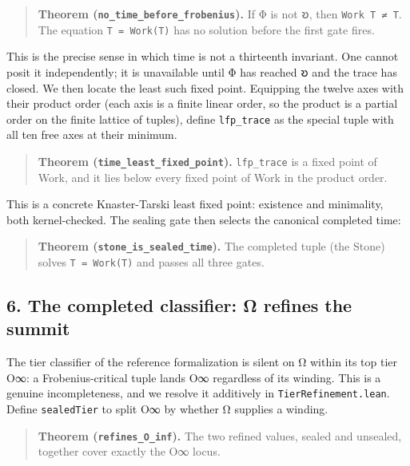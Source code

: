 \begin{quote}
\textbf{Theorem (\texttt{no\_time\_before\_frobenius}).} If Φ is not 𐑹,
then \texttt{Work\ T\ ≠\ T}. The equation \texttt{T\ =\ Work(T)} has no
solution before the first gate fires.
\end{quote}

This is the precise sense in which time is not a thirteenth invariant.
One cannot posit it independently; it is unavailable until Φ has reached
𐑹 and the trace has closed. We then locate the least such fixed point.
Equipping the twelve axes with their product order (each axis is a
finite linear order, so the product is a partial order on the finite
lattice of tuples), define \texttt{lfp\_trace} as the special tuple with
all ten free axes at their minimum.

\begin{quote}
\textbf{Theorem (\texttt{time\_least\_fixed\_point}).}
\texttt{lfp\_trace} is a fixed point of Work, and it lies below every
fixed point of Work in the product order.
\end{quote}

This is a concrete Knaster-Tarski least fixed point: existence and
minimality, both kernel-checked. The sealing gate then selects the
canonical completed time:

\begin{quote}
\textbf{Theorem (\texttt{stone\_is\_sealed\_time}).} The completed tuple
(the Stone) solves \texttt{T\ =\ Work(T)} and passes all three gates.
\end{quote}

\hypertarget{the-completed-classifier-ux3c9-refines-the-summit}{%
\subsection{6. The completed classifier: Ω refines the
summit}\label{the-completed-classifier-ux3c9-refines-the-summit}}

The tier classifier of the reference formalization is silent on Ω within
its top tier O∞: a Frobenius-critical tuple lands O∞ regardless of its
winding. This is a genuine incompleteness, and we resolve it additively
in \texttt{TierRefinement.lean}. Define \texttt{sealedTier} to split O∞
by whether Ω supplies a winding.

\begin{quote}
\textbf{Theorem (\texttt{refines\_O\_inf}).} The two refined values,
sealed and unsealed, together cover exactly the O∞ locus.
\end{quote}

